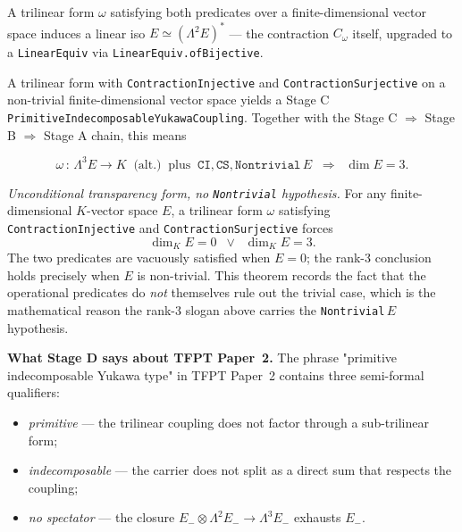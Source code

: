 \begin{theorem}
A trilinear form $\omega$ satisfying both predicates over a
finite-dimensional vector space induces a linear iso
$E \simeq (\Lambda^2 E)^*$ --- the contraction $C_\omega$ itself,
upgraded to a \texttt{LinearEquiv} via
\texttt{LinearEquiv.ofBijective}.
\end{theorem}

\begin{theorem}
A trilinear form with \texttt{ContractionInjective} and
\texttt{ContractionSurjective} on a non-trivial finite-dimensional
vector space yields a Stage C
\texttt{PrimitiveIndecomposableYukawaCoupling}. Together with the
Stage C $\Rightarrow$ Stage B $\Rightarrow$ Stage A chain, this means

\[
\boxed{\;
\omega \,:\,\Lambda^3 E \to K
\;\;\text{(alt.)}\;\;\text{plus}\;\;\texttt{CI}, \texttt{CS}, \texttt{Nontrivial}\,E
\;\;\Longrightarrow\;\;
\dim E = 3.
\;}
\]
\end{theorem}

\begin{theorem}
\emph{Unconditional transparency form, no \texttt{Nontrivial}
hypothesis.} For any finite-dimensional $K$-vector space $E$,
a trilinear form $\omega$ satisfying \texttt{ContractionInjective}
and \texttt{ContractionSurjective} forces
\[
\dim_K E = 0 \;\;\lor\;\; \dim_K E = 3.
\]
The two predicates are vacuously satisfied when $E = 0$;
the rank-3 conclusion holds precisely when $E$ is non-trivial.
This theorem records the fact that the operational predicates
do \emph{not} themselves rule out the trivial case, which is the
mathematical reason the rank-3 slogan above carries the
\texttt{Nontrivial}\,$E$ hypothesis.
\end{theorem}

\textbf{What Stage D says about TFPT Paper~2.}
The phrase "primitive indecomposable Yukawa type" in TFPT
Paper~2 contains three semi-formal qualifiers:

\begin{itemize}[leftmargin=1.6em, itemsep=0pt]
\item \emph{primitive} --- the trilinear coupling does not
    factor through a sub-trilinear form;
\item \emph{indecomposable} --- the carrier does not split as
    a direct sum that respects the coupling;
\item \emph{no spectator} --- the closure
    $E_- \otimes \Lambda^2 E_- \to \Lambda^3 E_-$ exhausts
    $E_-$.
\end{itemize}


